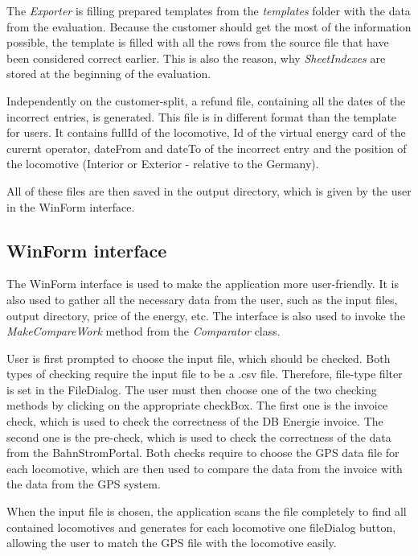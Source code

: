 \documentclass[11pt]{article}
\begin{document}
The \textit{Exporter} is filling prepared templates from the \textit{templates} folder with the data from the evaluation. Because the customer should get the most of the information possible, the template is filled with all the rows from the source file that have been considered correct earlier. This is also the reason, why \textit{SheetIndexes} are stored at the beginning of the evaluation. 

\pagebreak

Independently on the customer-split, a refund file, containing all the dates of the incorrect entries, is generated. This file is in different format than the template for users. It contains fullId of the locomotive, Id of the virtual energy card of the curernt operator, dateFrom and dateTo of the incorrect entry and the position of the locomotive (Interior or Exterior - relative to the Germany).

All of these files are then saved in the output directory, which is given by the user in the WinForm interface.

\subsection{WinForm interface}
\label{sec:WinFormInterface}

The WinForm interface is used to make the application more user-friendly. It is also used to gather all the necessary data from the user, such as the input files, output directory, price of the energy, etc. The interface is also used to invoke the \textit{MakeCompareWork} method from the \textit{Comparator} class.

User is first prompted to choose the input file, which should be checked. Both types of checking require the input file to be a .csv file. Therefore, file-type filter is set in the FileDialog. The user must then choose one of the two checking methods by clicking on the appropriate checkBox. The first one is the invoice check, which is used to check the correctness of the DB Energie invoice. The second one is the pre-check, which is used to check the correctness of the data from the BahnStromPortal. Both checks require to choose the GPS data file for each locomotive, which are then used to compare the data from the invoice with the data from the GPS system.

When the input file is chosen, the application scans the file completely to find all contained locomotives and generates for each locomotive one fileDialog button, allowing the user to match the GPS file with the locomotive easily. 
\end{document}
